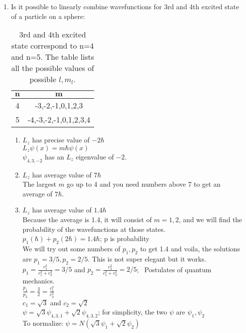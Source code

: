 \documentclass{article}
\begin{document}
\begin{enumerate}
\begin{enumerate}
    \end{enumerate}
\item Is it possible to linearly combine wavefunctions for 3rd and 4th excited state of a particle on a sphere:
\begin{table}[ht]
    \centering
    \begin{tabular}{ |c|c| } 
    \hline
    $\bm{n}$ & $\bm{m}$ \\
    \hline
    4 &  -3,-2,-1,0,1,2,3\\
    \hline
     5 &  -4,-3,-2,-1,0,1,2,3,4\\
    \hline
    \end{tabular}
    \caption{3rd and 4th excited state correspond to n=4 and n=5. The table lists all the possible values of possible $l,m_l$.}
    \label{tab:my_label}
\end{table}
    \begin{enumerate}
        \item $L_z$ has precise value of $-2\hbar$
        \\ $L_z\psi(x)=m\hbar\psi(x)$
        \\ $\psi_{4,3,-2}$ has an $L_z$ eigenvalue of $-2$.
        \item $L_z$ has average value of $7\hbar$
        \\ The largest $m$ go up to 4 and you need numbers above 7 to get an average of $7\hbar$.
        \item $L_z$ has average value of $1.4\hbar$
        \\ Because the average is 1.4, it will consist of $m=1,2$, and we will find the probability of the wavefunctions at those states. 
        \\ $p_1(\hbar)+p_2(2\hbar)=1.4\hbar$; p is probability
        \\ We will try out some numbers of $p_1,p_2$ to get 1.4 and voila, the solutions are $p_1=3/5,p_2=2/5$. This is not super elegant but it works.
        \\ $p_1=\frac{c_1^2}{c_1^2+c_2^2}=3/5$ and $p_2=\frac{c_2^2}{c_1^2+c_2^2}=2/5$; \ Postulates of quantum mechanics.
        \\ $\frac{p_1}{p_2}=\frac{3}{2}=\frac{c_1^2}{c_2^2}$
        \\ $c_1=\sqrt{3}$ and $c_2=\sqrt{2}$
        \\ $\psi=\sqrt{3}\psi_{4,3,1}+\sqrt{2}\psi_{4,3,2}$; for simplicity, the two $\psi$ are $\psi_1,\psi_2$
        \\ To normalize: $\psi=N\left(\sqrt{3}\psi_1+\sqrt{2}\psi_2\right)$

\end{enumerate}
\end{enumerate}
\end{document}
